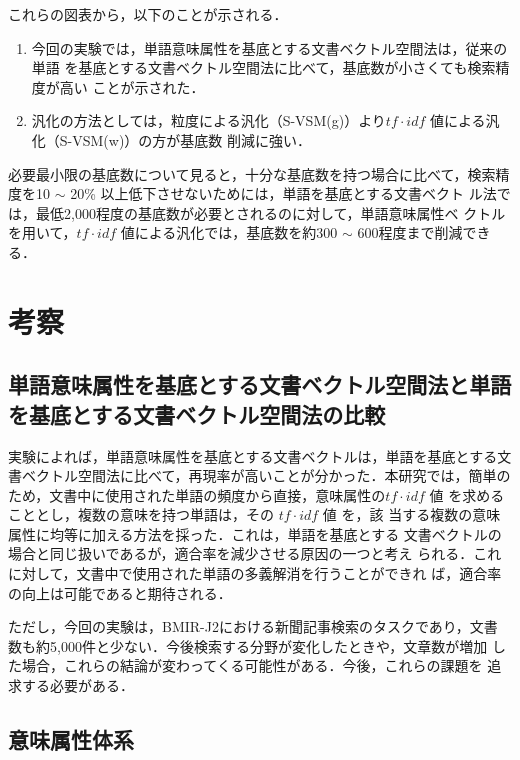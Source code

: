 これらの図表から，以下のことが示される．

\begin{enumerate}

\item 今回の実験では，単語意味属性を基底とする文書ベクトル空間法は，従来の単語
を基底とする文書ベクトル空間法に比べて，基底数が小さくても検索精度が高い
ことが示された．

\item 汎化の方法としては，粒度による汎化（S-VSM(g)）より$tf \cdot idf$ 値による汎化（S-VSM(w)）の方が基底数
削減に強い．

\end{enumerate}

必要最小限の基底数について見ると，十分な基底数を持つ場合に比べて，検索精
度を10 $ \sim$ 20\% 以上低下させないためには，単語を基底とする文書ベクト
ル法では，最低2,000程度の基底数が必要とされるのに対して，単語意味属性ベ
クトルを用いて，$tf \cdot idf$ 値による汎化では，基底数を約300 $ \sim $
600程度まで削減できる．

\section{考察}

\subsection{単語意味属性を基底とする文書ベクトル空間法と単語を基底とする文書ベクトル空間法の比較}

実験によれば，単語意味属性を基底とする文書ベクトルは，単語を基底とする文
書ベクトル空間法に比べて，再現率が高いことが分かった．本研究では，簡単の
ため，文書中に使用された単語の頻度から直接，意味属性の$tf \cdot idf$ 値
を求めることとし，複数の意味を持つ単語は，その $tf \cdot idf $ 値 を，該
当する複数の意味属性に均等に加える方法を採った．これは，単語を基底とする
文書ベクトルの場合と同じ扱いであるが，適合率を減少させる原因の一つと考え
られる．これに対して，文書中で使用された単語の多義解消を行うことができれ
ば，適合率の向上は可能であると期待される．

ただし，今回の実験は，BMIR-J2における新聞記事検索のタスクであり，文書
数も約5,000件と少ない．今後検索する分野が変化したときや，文章数が増加
した場合，これらの結論が変わってくる可能性がある．今後，これらの課題を
追求する必要がある．

\subsection{意味属性体系}


